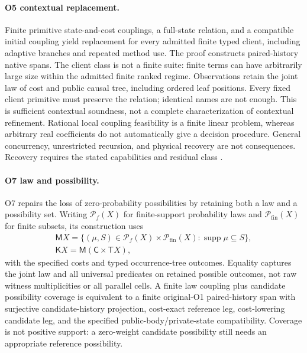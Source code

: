 \documentclass[11pt]{article}
\theoremstyle{definition}
\newcommand{\supp}{\operatorname{supp}}
\begin{document}
\paragraph{O5 contextual replacement.}
Finite primitive state-and-cost couplings, a full-state relation, and a compatible initial coupling yield replacement for every admitted finite typed client, including adaptive branches and repeated method use. The proof constructs paired-history native spans. The client class is not a finite suite: finite terms can have arbitrarily large size within the admitted finite ranked regime. Observations retain the joint law of cost and public causal tree, including ordered leaf positions. Every fixed client primitive must preserve the relation; identical names are not enough. This is sufficient contextual soundness, not a complete characterization of contextual refinement. Rational local coupling feasibility is a finite linear problem, whereas arbitrary real coefficients do not automatically give a decision procedure. General concurrency, unrestricted recursion, and physical recovery are not consequences. Recovery requires the stated capabilities and residual class \cite{O5}.

\paragraph{O7 law and possibility.}
O7 repairs the loss of zero-probability possibilities by retaining both a law and a possibility set. Writing $\mathcal P_f(X)$ for finite-support probability laws and $\mathcal P_{\mathrm{fin}}(X)$ for finite subsets, its construction uses
\[
 \begin{gathered}
 \mathsf{M}X=\{(\mu,S)\in\mathcal P_f(X)\times\mathcal P_{\mathrm{fin}}(X):
                         \supp\mu\subseteq S\},\\
 \mathsf{K}X=\mathsf{M}(\mathsf{C}\times\mathsf{T}X),
 \end{gathered}
\]
with the specified costs and typed occurrence-tree outcomes. Equality captures the joint law and all universal predicates on retained possible outcomes, not raw witness multiplicities or all parallel cells. A finite law coupling plus candidate possibility coverage is equivalent to a finite original-O1 paired-history span with surjective candidate-history projection, cost-exact reference leg, cost-lowering candidate leg, and the specified public-body/private-state compatibility. Coverage is not positive support: a zero-weight candidate possibility still needs an appropriate reference possibility.
\end{document}
